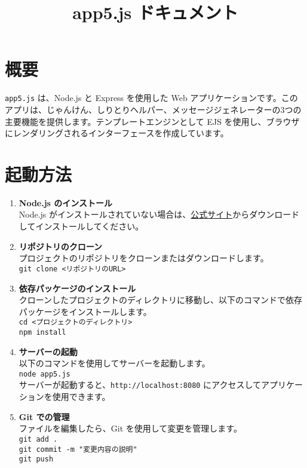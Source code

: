 \documentclass{article}
\title{app5.js ドキュメント}
\author{}
\date{}
\begin{document}
\maketitle

\section*{概要}
\texttt{app5.js} は、Node.js と Express を使用した Web アプリケーションです。このアプリは、じゃんけん、しりとりヘルパー、メッセージジェネレーターの3つの主要機能を提供します。テンプレートエンジンとして EJS を使用し、ブラウザにレンダリングされるインターフェースを作成しています。

\section*{起動方法}
\begin{enumerate}
    \item \textbf{Node.js のインストール} \\
    Node.js がインストールされていない場合は、\href{https://nodejs.org/}{公式サイト}からダウンロードしてインストールしてください。

    \item \textbf{リポジトリのクローン} \\
    プロジェクトのリポジトリをクローンまたはダウンロードします。\\
    \texttt{git clone <リポジトリのURL>}
    
    \item \textbf{依存パッケージのインストール} \\
    クローンしたプロジェクトのディレクトリに移動し、以下のコマンドで依存パッケージをインストールします。\\
    \texttt{cd <プロジェクトのディレクトリ>}\\
    \texttt{npm install}
    
    \item \textbf{サーバーの起動} \\
    以下のコマンドを使用してサーバーを起動します。\\
    \texttt{node app5.js} \\
    サーバーが起動すると、\texttt{http://localhost:8080} にアクセスしてアプリケーションを使用できます。
    
    \item \textbf{Git での管理} \\
    ファイルを編集したら、Git を使用して変更を管理します。\\
    \texttt{git add .}\\
    \texttt{git commit -m "変更内容の説明"}\\
    \texttt{git push}
\end{enumerate}
\end{document}
